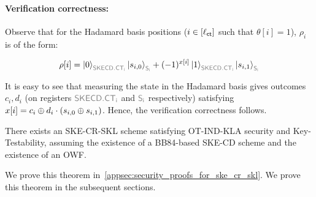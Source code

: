 \paragraph{Verification correctness:}

Observe that for the Hadamard basis positions ($i \in [\ell_{\mathsf{ct}}]$ such that
$\theta[i] = 1$), $\rho_i$ is of the form:

$$\rho[i] = \ket{0}_{\qreg{SKECD.CT_i}}\ket{s_{i,0}}_{\qreg{S_i}}+
(-1)^{x[i]}\ket{1}_{\qreg{SKECD.CT_i}}\ket{s_{i,1}}_{\qreg{S_i}}$$

It is easy to see that measuring the state in the Hadamard basis gives
outcomes $c_i, d_i$ (on registers $\qreg{SKECD.CT_i}$ and
$\qreg{S_i}$ respectively) satisfying $x[i] = c_i \oplus d_i \cdot
(s_{i,0} \oplus s_{i,1})$. Hence, the verification correctness follows.

\begin{theorem} There exists an SKE-CR-SKL scheme satisfying
OT-IND-KLA security and Key-Testability, assuming the existence of a
BB84-based SKE-CD scheme and the existence of an OWF.
\end{theorem}

\ifnum{}
We prove this theorem in~\cref{appsec:security_proofs_for_ske_cr_skl}.
\else
We prove this theorem in the subsequent sections.

\fi

